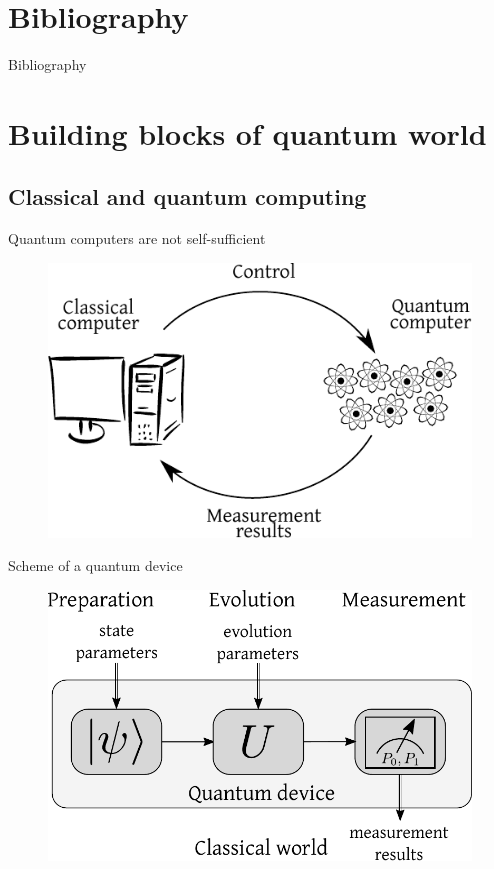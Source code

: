 \section{Bibliography}
\begin{frame}{Bibliography}
    \nocite{*}
    \printbibliography
\end{frame}
\section{Building blocks of quantum world}
\subsection{Classical and quantum computing}
\begin{frame}{Quantum computers are not self-sufficient}
    \begin{figure}
        \includegraphics[scale=1]{pics/sterowaniepomiar}
    \end{figure}
\end{frame}
\begin{frame}{Scheme of a quantum device}
    \begin{figure}
        \includegraphics[scale=0.7]{pics/experiment}
    \end{figure}
\end{frame}
